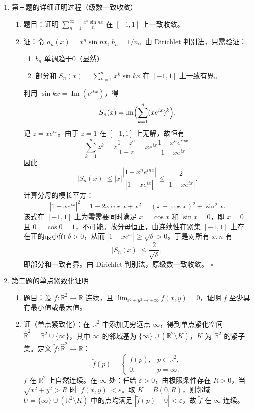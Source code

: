 \begin{enumerate}
\item[一、] 第三题的详细证明过程（级数一致收敛）
\begin{enumerate}
\item 题目：证明 $\displaystyle \sum_{n=1}^{\infty} \frac{x^n \sin nx}{n}$ 在 $[-1,1]$ 上一致收敛。
\item 证：令 $a_n(x)=x^n\sin nx$, $b_n=1/n$。由 Dirichlet 判别法，只需验证：
\begin{enumerate}
\item $b_n$ 单调趋于0（显然）
\item 部分和 $S_n(x)=\sum_{k=1}^n x^k\sin kx$ 在 $[-1,1]$ 上一致有界。
\end{enumerate}
利用 $\sin kx = \operatorname{Im}(e^{ikx})$，得
\[
S_n(x)=\operatorname{Im}\Bigl(\sum_{k=1}^n (xe^{ix})^k\Bigr).
\]
记 $z=xe^{ix}$。由于 $z=1$ 在 $[-1,1]$ 上无解，故恒有
\[
\sum_{k=1}^n z^k = z\frac{1-z^n}{1-z} = xe^{ix}\frac{1-x^ne^{inx}}{1-xe^{ix}}.
\]
因此
\[
|S_n(x)|\le |x|\frac{|1-x^ne^{inx}|}{|1-xe^{ix}|}\le\frac{2}{|1-xe^{ix}|}.
\]
计算分母的模长平方：
\[
|1-xe^{ix}|^2 = 1-2x\cos x+x^2 = (x-\cos x)^2+\sin^2x.
\]
该式在 $[-1,1]$ 上为零需要同时满足 $x=\cos x$ 和 $\sin x=0$，即 $x=0$ 且 $0=\cos0=1$，不可能。故分母恒正，由连续性在紧集 $[-1,1]$ 上存在正的最小值 $\delta>0$，从而 $|1-xe^{ix}|\ge\sqrt\delta>0$。于是对所有 $x,n$ 有
\[
|S_n(x)|\le \frac{2}{\sqrt\delta},
\]
即部分和一致有界。由 Dirichlet 判别法，原级数一致收敛。 \quad $\square$
\end{enumerate}

\item[二、] 第二题的单点紧致化证明
\begin{enumerate}
\item 题目：设 $f:\mathbb{R}^2\to\mathbb{R}$ 连续，且 $\displaystyle\lim_{x^2+y^2\to+\infty}f(x,y)=0$，证明 $f$ 至少具有最小值或最大值。
\item 证（单点紧致化）：在 $\mathbb{R}^2$ 中添加无穷远点 $\infty$，得到单点紧化空间 $\widehat{\mathbb{R}}^2=\mathbb{R}^2\cup\{\infty\}$，其中 $\infty$ 的邻域基为 $\{\infty\}\cup(\mathbb{R}^2\setminus K)$，$K$ 为 $\mathbb{R}^2$ 的紧子集。定义 $\tilde f:\widehat{\mathbb{R}}^2\to\mathbb{R}$：
\[
\tilde f(p)=\begin{cases}
f(p), & p\in\mathbb{R}^2,\\
0, & p=\infty.
\end{cases}
\]
$\tilde f$ 在 $\mathbb{R}^2$ 上自然连续。在 $\infty$ 处：任给 $\varepsilon>0$，由极限条件存在 $R>0$，当 $\sqrt{x^2+y^2}>R$ 时 $|f(x,y)|<\varepsilon$。取 $K=\overline{B}(0,R)$，则邻域 $U=\{\infty\}\cup(\mathbb{R}^2\setminus K)$ 中的点均满足 $|\tilde f(p)-0|<\varepsilon$，故 $\tilde f$ 在 $\infty$ 连续。


\end{enumerate}
\end{enumerate}
